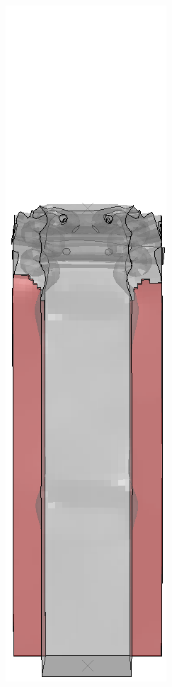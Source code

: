 \documentclass[
documentsize = a4, %
font = cmr, %
typesize = 11, %
printmode = true,
onehalfspacing = true,
language = en, %
titlepage = udciccp, %
degree = pt, %
dedication = true,
acknowledgements = true,
abstract-en = true,
abstract-es = false,
abstract-ga = false,
epigraphs = true,
toc = true,
lof = true,
lot = true,
frontmatterintoc = false,
notation = false,
minimal = false,
]{UDCthesis}
\begin{document}
\begin{figure}
\begin{minipage}[b]{.06\linewidth}
	\end{minipage}
	\quad
	\begin{minipage}[b]{.06\linewidth}
		\centering
		\includegraphics[width=\linewidth]{IMG_CUTRES/a6}

\end{minipage}
\end{figure}
\end{document}
